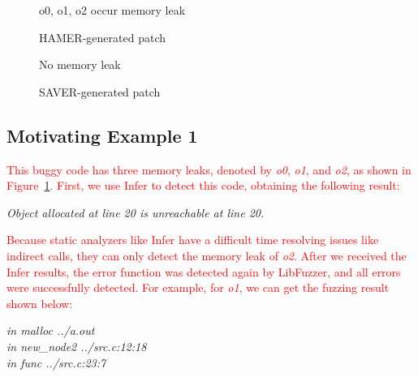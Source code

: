 \documentclass[a4j,dvipdfmx]{article}
\begin{document}
\begin{figure*}
  \begin{subfigure}{0.47\textwidth}
    
    \caption{o0, o1, o2 occur memory leak}
    \label{me1a}
  \end{subfigure}\hfill
  \begin{subfigure}{0.45\textwidth}
    
    \caption{HAMER-generated patch}
    \label{me1b}
  \end{subfigure}
  \caption{Motivating Example 1: Infer false-negative alarm} 
  \label{me1}
\end{figure*}

\begin{figure*}
  \begin{subfigure}{0.47\textwidth}
    
    \caption{No memory leak}
  \end{subfigure}\hfill
  \begin{subfigure}{0.45\textwidth}
    
    \caption{SAVER-generated patch}
  \end{subfigure}
  \caption{Motivating Example 2: Infer false-positive alarm}
  \label{me2}
\end{figure*}

\subsection{Motivating Example 1}
\textcolor{red}{
This buggy code has three memory leaks, denoted by {\it o0}, {\it o1}, and {\it o2}, as shown in Figure~\ref{me1a}. First, we use Infer to detect this code, obtaining the following result:}

\begin{minipage}{\textwidth}
\vspace{0.2cm}
\hspace{-0.45cm}
\raggedright
\textsl{Object allocated at line 20 is unreachable at line 20.}
\vspace{0.2cm}
\end{minipage}

\textcolor{red}{
Because static analyzers like Infer have a difficult time resolving issues like indirect calls, they can only detect the memory leak of {\it o2}. After we received the Infer results, the error function was detected again by LibFuzzer, and all errors were successfully detected. For example, for {\it o1}, we can get the fuzzing result shown below:
}

\begin{minipage}{\textwidth}
    \vspace{0.2cm}
    \textsl{\hspace{0.3cm}in malloc ../a.out\\\hspace{0.3cm}in new\_node2 ../src.c:12:18\\\hspace{0.3cm}in func ../src.c:23:7}
    \vspace{0.2cm}
\end{minipage}
\end{document}
